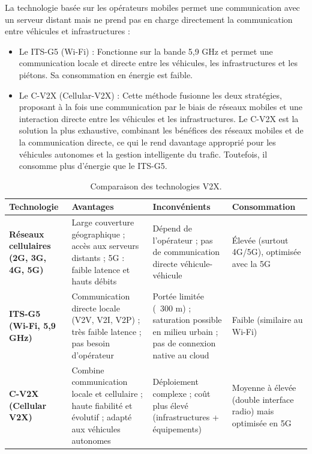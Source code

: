 La technologie basée sur les opérateurs mobiles permet une communication avec un serveur distant mais ne prend pas en charge directement la communication entre véhicules et infrastructures : 
\begin{itemize}
    \item Le ITS-G5 (Wi-Fi) : Fonctionne sur la bande 5,9 GHz et permet une communication locale et directe entre les véhicules, les infrastructures et les piétons. Sa consommation en énergie est faible.
    \item Le C-V2X (Cellular-V2X) : Cette méthode fusionne les deux stratégies, proposant à la fois une communication par le biais de réseaux mobiles et une interaction directe entre les véhicules et les infrastructures. Le C-V2X est la solution la plus exhaustive, combinant les bénéfices des réseaux mobiles et de la communication directe, ce qui le rend davantage approprié pour les véhicules autonomes et la gestion intelligente du trafic. Toutefois, il consomme plus d'énergie que le ITS-G5.
\end{itemize}

\begin{table}[H]
\centering
\begin{tabular}{|p{3cm}|p{4cm}|p{4cm}|p{3cm}|}
\hline
\textbf{Technologie} & \textbf{Avantages} & \textbf{Inconvénients} & \textbf{Consommation} \\
\hline
\textbf{Réseaux cellulaires (2G, 3G, 4G, 5G)} 
& Large couverture géographique ; accès aux serveurs distants ; 5G : faible latence et hauts débits 
& Dépend de l’opérateur ; pas de communication directe véhicule-véhicule 
& Élevée (surtout 4G/5G), optimisée avec la 5G \\
\hline
\textbf{ITS-G5 (Wi-Fi, 5,9 GHz)} 
& Communication directe locale (V2V, V2I, V2P) ; très faible latence ; pas besoin d’opérateur 
& Portée limitée (~300 m) ; saturation possible en milieu urbain ; pas de connexion native au cloud 
& Faible (similaire au Wi-Fi) \\
\hline
\textbf{C-V2X (Cellular V2X)} 
& Combine communication locale et cellulaire ; haute fiabilité et évolutif ; adapté aux véhicules autonomes 
& Déploiement complexe ; coût plus élevé (infrastructures + équipements) 
& Moyenne à élevée (double interface radio) mais optimisée en 5G \\
\hline
\end{tabular}
\caption{Comparaison des technologies V2X.}
\end{table}

